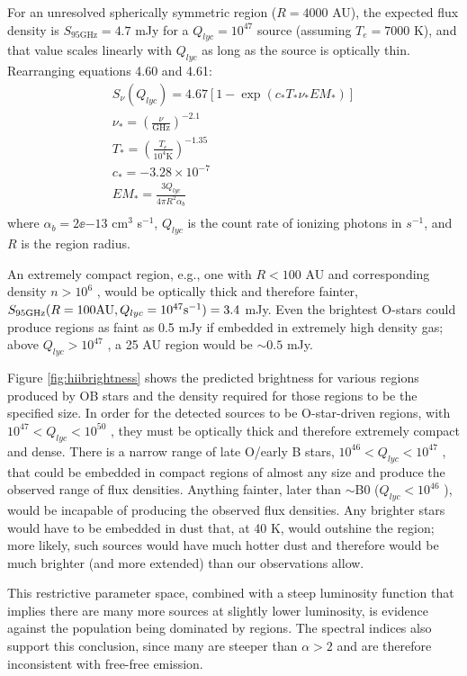 \documentclass[twocolumn]{aastex61}
\begin{document}
For an unresolved spherically symmetric \hii region ($R=4000$ AU), the expected
flux density is $S_{95 \mathrm{GHz}} = 4.7$ mJy for a $Q_{lyc}=10^{47}$ \pers
source (assuming $T_e=7000$ K), and that value scales linearly with $Q_{lyc}$
as long as the source is optically thin.  Rearranging \citet{Condon2007a} equations
4.60 and 4.61:
\begin{eqnarray}
S_{\nu}(Q_{lyc})  = 4.67 \left[1-\exp\left(c_* T_* \nu_* EM_* \right) \right] \nonumber \\
\nu_* = \left(\frac{\nu}{\mathrm{GHz}}\right)^{-2.1} \nonumber \\
T_* = \left(\frac{T_e}{10^4 \mathrm{K}}\right)^{-1.35} \nonumber \\
c_* = -3.28\times10^{-7} \nonumber \\
EM_* = \frac{3 Q_{lyc}}{4 \pi R^2 \alpha_b} \nonumber \\
\end{eqnarray}
where $\alpha_b=2\ee{-13}$ cm$^3$ s$^{-1}$, $Q_{lyc}$ is the count rate
of ionizing photons in $s^{-1}$, and $R$ is the \hii region radius.

An extremely compact \hii region,
e.g., one with $R<100$ AU and corresponding density $n>10^6$ \percc, would be
optically thick and therefore fainter, $S_{95 \mathrm{GHz}}(R=100 \mathrm{AU},
Q_{lyc}=10^{47} \mathrm{s}^{-1})=3.4$ mJy.  Even the brightest O-stars could produce \hii
regions as faint as 0.5 mJy if embedded in extremely high density gas; above
$Q_{lyc}>10^{47}$ \pers, a 25 AU \hii region would be $\sim0.5$ mJy.

Figure \ref{fig:hiibrightness} shows the predicted brightness for various \hii
regions produced by OB stars and the density required for those \hii regions
to be the specified size.  In
order for the detected sources to be O-star-driven \hii regions, with $10^{47}
< Q_{lyc} < 10^{50}$ \pers, they must be optically thick and therefore
extremely compact and dense.  There is a narrow range of late O/early B stars,
$10^{46} < Q_{lyc} < 10^{47}$ \pers, that could be embedded in compact \hii
regions of almost any size and produce the observed range of flux densities.
Anything fainter, later than $\sim$B0 ($Q_{lyc}<10^{46}$ \pers), would be
incapable of producing the observed flux densities.
Any brighter stars would have to be embedded in dust that, at 40 K, would
outshine the \hii region; more likely, such sources would have much hotter dust
and therefore would be much brighter (and more extended) than our observations
allow.

This restrictive parameter space, combined with a steep luminosity function
that implies there are many more sources at slightly lower luminosity, is
evidence against the population being dominated by \hii regions.  The spectral
indices also support this conclusion, since many are steeper than $\alpha>2$
and are therefore inconsistent with free-free emission.
\end{document}

